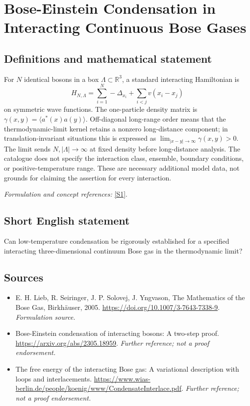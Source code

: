 \documentclass[11pt]{article}
\begin{document}
\section*{\texorpdfstring{Bose-Einstein Condensation in Interacting Continuous Bose Gases}{Bose-Einstein Condensation in Interacting Continuous Bose Gases}}\label{87}
\subsection{Definitions and mathematical statement}
For $N$ identical bosons in a box $\Lambda\subset{\mathbb{R}}^3$, a standard interacting Hamiltonian is
\[
 H_{N,\Lambda}=\sum_{i=1}^N-\Delta_{x_i}+\sum_{i<j}v(x_i-x_j)
\]
on symmetric wave functions. The one-particle density matrix is $\gamma(x,y)=\langle a^*(x)a(y)\rangle$. Off-diagonal long-range order means that the thermodynamic-limit kernel retains a nonzero long-distance component; in translation-invariant situations this is expressed as $\lim_{|x-y|\to\infty}\gamma(x,y)>0$. The limit sends $N,|\Lambda|\to\infty$ at fixed density before long-distance analysis. The catalogue does not specify the interaction class, ensemble, boundary conditions, or positive-temperature range. These are necessary additional model data, not grounds for claiming the assertion for every interaction.
\par\smallskip\textit{Formulation and concept references:} \href{https://doi.org/10.1007/3-7643-7338-9}{[S1]}.

\subsection{Short English statement}
Can low-temperature condensation be rigorously established for a specified interacting three-dimensional continuum Bose gas in the thermodynamic limit?
\subsection{Sources}
\begin{itemize}
\item[S1]E. H. Lieb, R. Seiringer, J. P. Solovej, J. Yngvason, The Mathematics of the Bose Gas, Birkhäuser, 2005.
\url{https://doi.org/10.1007/3-7643-7338-9}.
\textit{Formulation source.}
\item[S2]Bose-Einstein condensation of interacting bosons: A two-step proof.
\url{https://arxiv.org/abs/2305.18959}.
\textit{Further reference; not a proof endorsement.}
\item[S3]The free energy of the interacting Bose gas: A variational description with loops and interlacements.
\url{https://www.wias-berlin.de/people/koenig/www/CondensateInterlace.pdf}.
\textit{Further reference; not a proof endorsement.}
\end{itemize}
\end{document}
